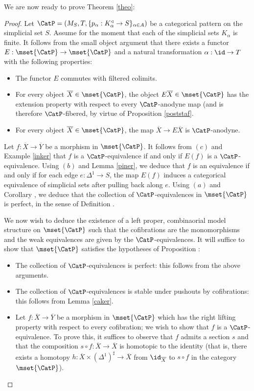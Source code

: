 We are now ready to prove Theorem \ref{theo}:

\begin{proof}
Let $\CatP = (M_S, T, \{ p_{\alpha}: K_{\alpha}^{\triangleleft} \rightarrow S \}_{\alpha \in A})$
be a categorical pattern on the simplicial set $S$. Assume for the moment that each of the simplicial sets $K_{\alpha}$ is finite. It follows from the small object argument that there exists a functor
$E: \mset{ \CatP} \rightarrow \mset{ \CatP}$ and a natural transformation
$\alpha: \id \rightarrow T$ with the following properties:
\begin{itemize}
\item[$(a)$] The functor $E$ commutes with filtered colimits.
\item[$(b)$] For every object $\overline{X} \in \mset{ \CatP}$, the object
$E \overline{X} \in \mset{ \CatP}$ has the extension property with respect to every
$\CatP$-anodyne map (and is therefore $\CatP$-fibered, by virtue of Proposition \ref{poststaf}.
\item[$(c)$] For every object $\overline{X} \in \mset{\CatP}$, the map 
$\overline{X} \rightarrow E \overline{X}$ is $\CatP$-anodyne.
\end{itemize}
Let $f: \overline{X} \rightarrow \overline{Y}$ be a morphism in $\mset{\CatP}$. 
It follows from $(c)$ and Example \ref{inker} that $f$ is a $\CatP$-equivalence if and only
if $E(f)$ is a $\CatP$-equivalence. Using $(b)$ and Lemma \ref{piner}, we deduce that 
$f$ is an equivalence if and only if for each edge $e: \Delta^1 \rightarrow S$, the map
$E(f)$ induces a categorical equivalence of simplicial sets after pulling back along $e$.
Using $(a)$ and Corollary , we deduce that the collection of $\CatP$-equivalences
in $\mset{ \CatP}$ is perfect, in the sense of Definition .

We now wish to deduce the existence of a left proper, combinaorial model structure on
$\mset{ \CatP}$ such that the cofibrations are the monomorphisms and the weak equivalences
are given by the $\CatP$-equivalences. It will suffice to show that $\mset{ \CatP}$ satisfies
the hypotheses of Proposition :

\begin{itemize}
\item[$(1)$] The collection of $\CatP$-equivalences is perfect: this follows from the above arguments.
\item[$(2)$] The collection of $\CatP$-equivalences is stable under pushouts by cofibrations:
this follows from Lemma \ref{caker}.
\item[$(3)$] Let $f: \overline{X} \rightarrow \overline{Y}$ be a morphism in $\mset{\CatP}$ which has
the right lifting property with respect to every cofibration; we wish to show that $f$ is a 
$\CatP$-equivalence. To prove this, it suffices to observe that $f$ admits a section $s$
and that the composition $s \circ f: \overline{X} \rightarrow \overline{X}$ is homotopic to the identity
(that is, there exists a homotopy $h: \overline{X} \times (\Delta^1)^{\sharp} \rightarrow \overline{X}$
from $\id_{\overline{X}}$ to $s \circ f$ in the category $\mset{ \CatP}$).
\end{itemize}


\end{proof}
